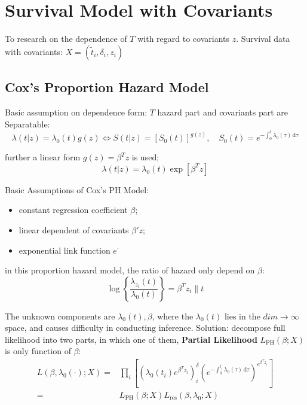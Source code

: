 \section{Survival Model with Covariants} 

To research on the dependence of $ T $ with regard to covariants $ z $. Survival data with covariants: $ X=(\tilde{t}_i,\delta _i,z_i) $

\subsection{Cox's Proportion Hazard Model}
Basic assumption on dependence form: $ T $ hazard part and covariants part are Separatable:
\begin{equation}
    \lambda (t|z)=\lambda _0(t)g(z)\Leftrightarrow S(t|z)=\left[S_0(t)\right]^{g(z)},\quad S_0(t)=e^{-\int _0^t\lambda _0(\tau) \,\mathrm{d}\tau}
\end{equation}

further a linear form $ g(z)=\beta ^Tz $ is used;
\begin{equation}
     \lambda (t|z)=\lambda _0(t)\exp\left[ \beta ^Tz \right]
\end{equation}

Basic Assumptions of Cox's PH Model:
\begin{itemize}[topsep=2pt,itemsep=0pt]
    \item constant regression coefficient $ \beta  $;
    \item linear dependent of covariants $ \beta 'z $;
    \item exponential link function $ e^\cdot $
\end{itemize}

    

in this proportion hazard model, the ratio of hazard only depend on $ \beta  $:
\begin{equation}
    \log\left\{ \dfrac{\lambda _{z_i}(t)}{\lambda _0(t)} \right\}=\beta ^Tz_i\parallel t 
\end{equation}

The unknown components are $ \lambda _0(t),\beta  $, where the $ \lambda _0(t) $ lies in the $ dim\to\infty $ space, and causes difficulty in conducting inference. Solution: decompose full likelihood into two parts, in which one of them, \textbf{Partial Likelihood} $ L_\mathrm{ PH }(\beta ;X)  $ is only function of $ \beta  $:
\begin{align}
    L(\beta ,\lambda _0(\cdot);X)=&\prod_{i}\left[ \left( \lambda _0(t_i)e^{\beta ^Tz_i} \right)^\delta _i\left( e^{-\int _{0}^{t_i}\lambda _0(\tau) \,\mathrm{d}\tau} \right)^{e^{\beta ^Tz_i}} \right]\\
    =&L_{\mathrm{ PH } }(\beta ;X)L_{\mathrm{ res } }(\beta ,\lambda _0;X)
\end{align}

